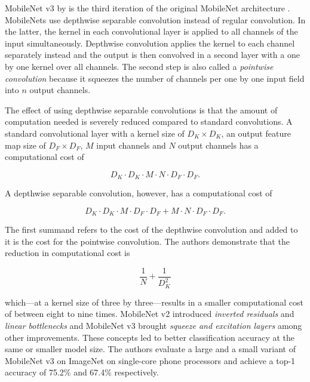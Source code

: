 \documentclass[final]{vutinfth} %
\begin{document}
MobileNet v3 by \textcite{howard2019} is the third iteration of the
original MobileNet architecture \cite{howard2017}. MobileNets use
depthwise separable convolution instead of regular convolution. In the
latter, the kernel in each convolutional layer is applied to all
channels of the input simultaneously. Depthwise convolution applies
the kernel to each channel separately instead and the output is then
convolved in a second layer with a one by one kernel over all
channels. The second step is also called a \emph{pointwise
convolution} because it squeezes the number of channels per one by one
input field into $n$ output channels.

The effect of using depthwise separable convolutions is that the
amount of computation needed is severely reduced compared to standard
convolutions. A standard convolutional layer with a kernel size of
$D_{K}\times D_{K}$, an output feature map size of $D_{F}\times D_{F}$, $M$
input channels and $N$ output channels has a computational cost of

\begin{equation}
  \label{eq:conv-comp-cost}
  D_{K}\cdot D_{K}\cdot M \cdot N \cdot D_{F}\cdot D_{F}.
\end{equation}

A depthwise separable convolution, however, has a computational cost of

\begin{equation}
  \label{eq:dwsconv-comp-cost}
  D_{K}\cdot D_{K}\cdot M \cdot D_{F}\cdot D_{F} + M \cdot N \cdot D_{F}\cdot D_{F}.
\end{equation}

The first summand refers to the cost of the depthwise convolution and
added to it is the cost for the pointwise convolution. The authors
demonstrate that the reduction in computational cost is

\begin{equation}
  \label{eq:dwsconv-comp-reduction}
  \frac{1}{N} + \frac{1}{D^{2}_{K}}
\end{equation}

which—at a kernel size of three by three—results in a smaller
computational cost of between eight to nine times. MobileNet v2
\cite{sandler2018} introduced \emph{inverted residuals} and
\emph{linear bottlenecks} and MobileNet v3 \cite{howard2019} brought
\emph{squeeze and excitation layers} among other improvements. These
concepts led to better classification accuracy at the same or smaller
model size. The authors evaluate a large and a small variant of
MobileNet v3 on ImageNet on single-core phone processors and achieve a
top-1 accuracy of 75.2\% and 67.4\% respectively.
\end{document}
